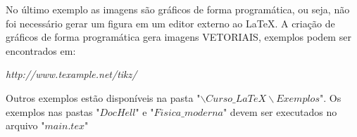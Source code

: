 \begin{frame}
No último exemplo as imagens são gráficos de forma programática, ou seja,
não foi necessário gerar um figura em um editor externo ao \LaTeX.
A criação de gráficos de forma programática gera imagens VETORIAIS, exemplos podem ser encontrados em:

\vspace*{0.5cm}
\begin{center}
\textit{http://www.texample.net/tikz/}
\end{center}
\vspace*{0.5cm}

Outros exemplos estão disponíveis na pasta "$\backslash Curso\_ LaTeX \backslash Exemplos$". 
Os exemplos nas pastas "$DocHell$" e "$Fisica\_moderna$" devem ser executados no arquivo "$main.tex$"
\end{frame}


